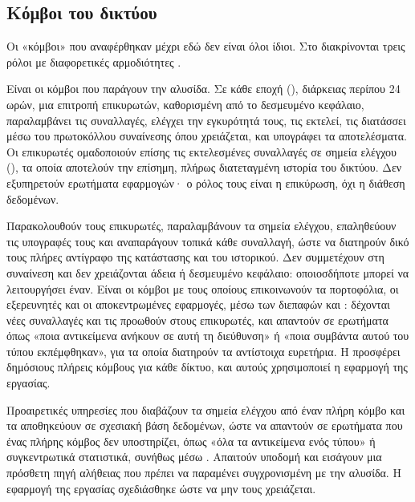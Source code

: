 \subsection{Κόμβοι του δικτύου}
\label{sec:nodes}

Οι «κόμβοι» που αναφέρθηκαν μέχρι εδώ δεν είναι όλοι ίδιοι. Στο  διακρίνονται
τρεις ρόλοι με διαφορετικές αρμοδιότητες \cite{sui-full-node}.

\begin{description}[leftmargin=1.2em,itemsep=3pt]
  \item[Επικυρωτές (\en{validators}).] Είναι οι κόμβοι που παράγουν την αλυσίδα. Σε κάθε
    εποχή (), διάρκειας περίπου 24 ωρών, μια επιτροπή επικυρωτών, καθορισμένη
    από το δεσμευμένο κεφάλαιο, παραλαμβάνει τις συναλλαγές, ελέγχει την εγκυρότητά τους,
    τις εκτελεί, τις διατάσσει μέσω του πρωτοκόλλου συναίνεσης όπου χρειάζεται, και
    υπογράφει τα αποτελέσματα. Οι επικυρωτές ομαδοποιούν επίσης τις εκτελεσμένες
    συναλλαγές σε σημεία ελέγχου (), τα οποία αποτελούν την επίσημη,
    πλήρως διατεταγμένη ιστορία του δικτύου. Δεν εξυπηρετούν ερωτήματα εφαρμογών· ο ρόλος
    τους είναι η επικύρωση, όχι η διάθεση δεδομένων.
  \item[Πλήρεις κόμβοι (\en{full nodes}).] Παρακολουθούν τους επικυρωτές, παραλαμβάνουν
    τα σημεία ελέγχου, επαληθεύουν τις υπογραφές τους και αναπαράγουν τοπικά κάθε
    συναλλαγή, ώστε να διατηρούν δικό τους πλήρες αντίγραφο της κατάστασης και του
    ιστορικού. Δεν συμμετέχουν στη συναίνεση και δεν χρειάζονται άδεια ή δεσμευμένο
    κεφάλαιο: οποιοσδήποτε μπορεί να λειτουργήσει έναν. Είναι οι κόμβοι με τους οποίους
    επικοινωνούν τα πορτοφόλια, οι εξερευνητές και οι αποκεντρωμένες εφαρμογές, μέσω των
    διεπαφών  και : δέχονται νέες συναλλαγές και τις προωθούν στους
    επικυρωτές, και απαντούν σε ερωτήματα όπως «ποια αντικείμενα ανήκουν σε αυτή τη
    διεύθυνση» ή «ποια συμβάντα αυτού του τύπου εκπέμφθηκαν», για τα οποία διατηρούν
    τα αντίστοιχα ευρετήρια. Η  προσφέρει δημόσιους πλήρεις κόμβους για
    κάθε δίκτυο, και αυτούς χρησιμοποιεί η εφαρμογή της εργασίας.
  \item[\en{Indexers}.] Προαιρετικές υπηρεσίες που διαβάζουν τα σημεία ελέγχου από έναν
    πλήρη κόμβο και τα αποθηκεύουν σε σχεσιακή βάση δεδομένων, ώστε να απαντούν σε
    ερωτήματα που ένας πλήρης κόμβος δεν υποστηρίζει, όπως «όλα τα αντικείμενα ενός τύπου»
    ή συγκεντρωτικά στατιστικά, συνήθως μέσω . Απαιτούν υποδομή και εισάγουν
    μια πρόσθετη πηγή αλήθειας που πρέπει να παραμένει συγχρονισμένη με την αλυσίδα. Η
    εφαρμογή της εργασίας σχεδιάσθηκε ώστε να μην τους χρειάζεται.
\end{description}

